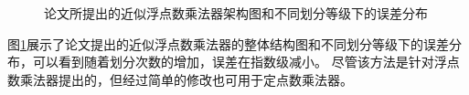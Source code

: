 \begin{figure}[!htb]
    \centering
\caption{论文所提出的近似浮点数乘法器架构图和不同划分等级下的误差分布}
\label{AC:AM:OU}
\end{figure}
图\ref{AC:AM:OU}展示了论文提出的近似浮点数乘法器的整体结构图和不同划分等级下的误差分布，可以看到随着划分次数的增加，误差在指数级减小。
尽管该方法是针对浮点数乘法器提出的，但经过简单的修改也可用于定点数乘法器。

